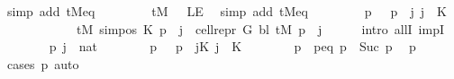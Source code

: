 \begin{isabellebody}
\ {\isacharparenleft}{\kern0pt}simp\ add{\isacharcolon}{\kern0pt}\ tM{\isacharunderscore}{\kern0pt}eq{\isacharparenright}{\kern0pt}\isanewline
\ \ \isamarkupfalse%
\isanewline
\ \ \ \ \isamarkupfalse%
\ {\isachardoublequoteopen}{\isacharquery}{\kern0pt}tM{\isacharprime}{\kern0pt}\ {}\ {\isacharequal}{\kern0pt}\ LE{}{\isachardoublequoteclose}\ \isamarkupfalse%
\ {\isacharparenleft}{\kern0pt}simp\ add{\isacharcolon}{\kern0pt}\ tM{\isacharprime}{\kern0pt}{\isacharunderscore}{\kern0pt}eq{\isacharparenright}{\kern0pt}\isanewline
\ \ \isamarkupfalse%
\isanewline
\ \ \ \ \isamarkupfalse%
\ {\isachardoublequoteopen}{\isasymforall}p{\isachardot}{\kern0pt}\ {}\ {\isasymle}\ p\ {\isasymlongrightarrow}\ {\isacharparenleft}{\kern0pt}{\isasymforall}j{\isachardot}{\kern0pt}\ j\ {\isacharless}{\kern0pt}\ {\isacharquery}{\kern0pt}K\ {\isasymlongrightarrow}\isanewline
\ \ \ \ \ \ \ \ \ \ \ \ {\isacharquery}{\kern0pt}tM{\isacharprime}{\kern0pt}\ {\isacharparenleft}{\kern0pt}sim{\isacharunderscore}{\kern0pt}pos\ {\isacharquery}{\kern0pt}K\ p\ {\isacharplus}{\kern0pt}\ j{\isacharparenright}{\kern0pt}\ {\isacharequal}{\kern0pt}\ cell{\isacharunderscore}{\kern0pt}repr\ {\isacharquery}{\kern0pt}G\ {\isacharquery}{\kern0pt}bl\ {\isacharparenleft}{\kern0pt}{\isacharquery}{\kern0pt}tM\ p{\isacharparenright}{\kern0pt}\ {\isacharbang}{\kern0pt}\ j{\isacharparenright}{\kern0pt}{\isachardoublequoteclose}\isanewline
\ \ \ \ \isamarkupfalse%
\ {\isacharparenleft}{\kern0pt}intro\ allI\ impI{\isacharparenright}{\kern0pt}\isanewline
\ \ \ \ \ \ \isamarkupfalse%
\ p\ j\ {\isacharcolon}{\kern0pt}{\isacharcolon}{\kern0pt}\ nat\isanewline
\ \ \ \ \ \ \isamarkupfalse%
\ p{}{\isacharcolon}{\kern0pt}\ {\isachardoublequoteopen}{}\ {\isasymle}\ p{\isachardoublequoteclose}\ \ jK{\isacharcolon}{\kern0pt}\ {\isachardoublequoteopen}j\ {\isacharless}{\kern0pt}\ {\isacharquery}{\kern0pt}K{\isachardoublequoteclose}\isanewline
\ \ \ \ \ \ \isamarkupfalse%
\ p{}\ \ p{\isacharunderscore}{\kern0pt}eq{\isacharcolon}{\kern0pt}\ {\isachardoublequoteopen}p\ {\isacharequal}{\kern0pt}\ Suc\ p{}{\isachardoublequoteclose}\ \isamarkupfalse%
\ p{}\ \isamarkupfalse%
\ {\isacharparenleft}{\kern0pt}cases\ p{\isacharparenright}{\kern0pt}\ auto\isanewline
\ \ \ \ \ \ \isamarkupfalse%

\end{isabellebody}
